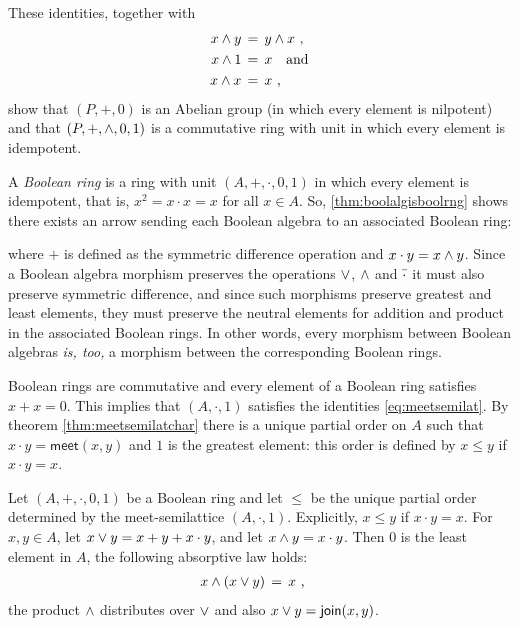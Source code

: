These identities, together with
\begin{align*}
	x \wedge y & \,=\, y\wedge x \text{ ,} \\
	x\wedge 1 & \,=\, x\quad\text{and} \\
	x\wedge x & \,=\, x
	\text{ ,}
\end{align*}
%
show that $(P,+,0)$ is an Abelian group (in which every element
is nilpotent) and that $(P,+,\wedge,0,1)$ is a commutative
ring with unit in which every element is idempotent.

A \emph{Boolean ring} is a ring with unit $(A,+,\cdot,0,1)$ in which
every element is idempotent, that is, $x^{2}=x\cdot x=x$ for all $x\in A$.
So, \ref{thm:boolalgisboolrng} shows there exists an arrow sending
each Boolean algebra to an associated Boolean ring:
\begin{center}
\end{center}
where $+$ is defined as the symmetric difference operation and
$x\cdot y=x\wedge y$. Since a Boolean algebra morphism preserves
the operations $\vee$, $\wedge$ and $\bar{\cdot}$ it must also
preserve symmetric difference, and since such morphisms preserve greatest
and least elements, they must preserve the neutral elements for addition
and product in the associated Boolean rings. In other words, every morphism
between Boolean algebras \emph{is, too,} a morphism between the corresponding
Boolean rings.

Boolean rings are commutative and every element of a Boolean ring satisfies
$x+x=0$. This implies that $(A,\cdot,1)$ satisfies the identities
\eqref{eq:meetsemilat}. By theorem \ref{thm:meetsemilatchar} there is a
unique partial order on $A$ such that $x\cdot y =\mathsf{meet}(x,y)$ and
$1$ is the greatest element: this order is defined by $x\leq y$ if
$x\cdot y=x$.

\begin{lemmaBoolRngIsDistLat}\label{thm:boolrngisdistlat}
	Let $(A,+,\cdot,0,1)$ be a Boolean ring and let $\leq$ be the
	unique partial order determined by the meet-semilattice
	$(A,\cdot,1)$. Explicitly, $x\leq y$ if $x\cdot y=x$.
	For $x,y\in A$, let $x\vee y= x+y+x\cdot y$, and let
	$x\wedge y=x\cdot y$. Then $0$ is the least element in $A$,
	the following absorptive law holds:
	\begin{align*}
		x\wedge (x\vee y) & \,=\, x
		\text{ ,}
	\end{align*}
	the product $\wedge$ distributes over $\vee$
	and also $x\vee y= \mathsf{join}(x,y)$.
\end{lemmaBoolRngIsDistLat}

